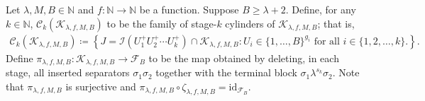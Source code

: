 \documentclass[10pt,a4paper]{amsart}
\begin{document}
Let $\lambda,M,B\in\mathbb{N}$ and $f:\mathbb{N}\to\mathbb{N}$ be a function. Suppose $B\geq\lambda+2$. Define, for any $k\in\mathbb{N}$, $\mathscr{C}_k(\mathcal{K}_{\lambda,f,M,B})$ to be the family of stage-$k$ cylinders of $\mathcal{K}_{\lambda,f,M,B}$; that is,
\begin{align*}
    \mathscr{C}_k(\mathcal{K}_{\lambda,f,M,B})
    \coloneqq
    \left\{J=\mathcal{I}\!\left(U^+_1U^+_2\cdots U^+_k\right)\cap\mathcal{K}_{\lambda,f,M,B}:
    U_i\in\{1,\dots,B\}^{g_i}\text{ for all $i\in\{1,2,\ldots,k\}$.}\right\}.
\end{align*}
Define $\pi_{\lambda,f,M,B}:\mathcal{K}_{\lambda,f,M,B}\to \mathcal{F}_B$ to be the map obtained by deleting, in each stage, all inserted separators $\sigma_1\sigma_2$ together with the terminal block $\sigma_1\lambda^{s_k}\sigma_2$. Note that $\pi_{\lambda,f,M,B}$ is surjective and $\pi_{\lambda,f,M,B}\circ\zeta_{\lambda,f,M,B}=\mathrm{id}_{\mathcal{F}_B}$.
\end{document}

